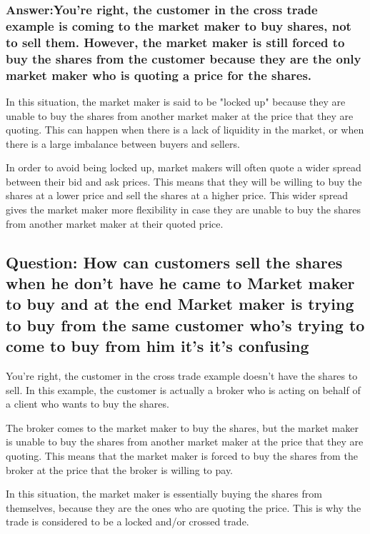 \documentclass[11pt]{article}
\begin{document}
\subsubsection{Answer:You're right, the customer in the cross trade example is coming to the market maker to buy shares, not to sell them. However, the market maker is still forced to buy the shares from the customer because they are the only market maker who is quoting a price for the shares.}
\label{sec:orgdc8f178}

In this situation, the market maker is said to be "locked up" because they are unable to buy the shares from another market maker at the price that they are quoting. This can happen when there is a lack of liquidity in the market, or when there is a large imbalance between buyers and sellers.

In order to avoid being locked up, market makers will often quote a wider spread between their bid and ask prices. This means that they will be willing to buy the shares at a lower price and sell the shares at a higher price. This wider spread gives the market maker more flexibility in case they are unable to buy the shares from another market maker at their quoted price.


\subsection{Question: How can customers sell the shares when he don't have he came to Market maker to buy and at the end Market maker is trying to buy from the same customer who's trying to come to buy from him it's it's confusing}
\label{sec:org3b63aae}

You're right, the customer in the cross trade example doesn't have the shares to sell. In this example, the customer is actually a broker who is acting on behalf of a client who wants to buy the shares.

The broker comes to the market maker to buy the shares, but the market maker is unable to buy the shares from another market maker at the price that they are quoting. This means that the market maker is forced to buy the shares from the broker at the price that the broker is willing to pay.

In this situation, the market maker is essentially buying the shares from themselves, because they are the ones who are quoting the price. This is why the trade is considered to be a locked and/or crossed trade.
\end{document}
